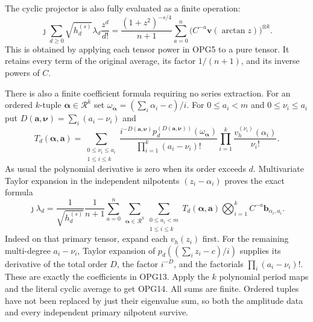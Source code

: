 The cyclic projector is also fully evaluated as a finite operation:
\[
 \jmath\sum_{d\geq0}\sqrt{h_d^{(s)}}\lambda_d\frac{z^d}{d!}
 =\frac{(1+z^2)^{-s/4}}{n+1}
       \sum_{a=0}^{n}\bigl(C^{-a}\mathbf v(\arctan z)\bigr)^{\otimes k}.
 \tag{OPG12}
\]
This is obtained by applying each tensor power in OPG5 to a pure
tensor. It retains every term of the original average, its factor
$1/(n+1)$, and its inverse powers of $C$.

There is also a finite coefficient formula requiring no series
extraction. For an ordered $k$-tuple
$\boldsymbol\alpha\in\mathcal R^k$ set
$\omega_{\boldsymbol\alpha}=(\sum_i\alpha_i-c)/i$.
For $0\leq a_i<m$ and $0\leq\nu_i\leq a_i$ put
$D(\mathbf a,\boldsymbol\nu)=\sum_i(a_i-\nu_i)$ and
\[
 T_d(\boldsymbol\alpha,\mathbf a)=
 \sum_{\substack{0\leq\nu_i\leq a_i\\1\leq i\leq k}}
 \frac{i^{-D(\mathbf a,\boldsymbol\nu)}
        p_d^{(D(\mathbf a,\boldsymbol\nu))}(\omega_{\boldsymbol\alpha})}
        {\prod_{i=1}^k(a_i-\nu_i)!}
 \prod_{i=1}^k\frac{v_h^{(\nu_i)}(\alpha_i)}{\nu_i!}.
 \tag{OPG13}
\]
As usual the polynomial derivative is zero when its order exceeds
$d$. Multivariate Taylor expansion in the independent nilpotents
$(z_i-\alpha_i)$ proves the exact formula
\[
\boxed{
 \jmath\lambda_d=
 \frac1{\sqrt{h_d^{(s)}}}\frac1{n+1}
 \sum_{a=0}^{n}\ \sum_{\boldsymbol\alpha\in\mathcal R^k}
 \sum_{\substack{0\leq a_i<m\\1\leq i\leq k}}
 T_d(\boldsymbol\alpha,\mathbf a)
 \bigotimes_{i=1}^k C^{-a}\mathbf b_{\alpha_i,a_i}.
}\tag{OPG14}
\]
Indeed on that primary tensor, expand each $v_h(z_i)$ first.
For the remaining multi-degree $a_i-\nu_i$, Taylor expansion of
$p_d((\sum_i z_i-c)/i)$ supplies its derivative of the total
order $D$, the factor $i^{-D}$, and the factorials
$\prod_i(a_i-\nu_i)!$. These are exactly the coefficients in
OPG13. Apply the $k$ polynomial period maps and the literal cyclic
average to get OPG14. All sums are finite. Ordered tuples have
not been replaced by just their eigenvalue sum, so both the
amplitude data and every independent primary nilpotent survive.

